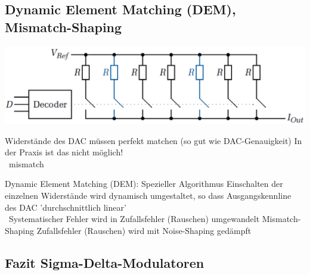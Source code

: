 \subsection{Dynamic Element Matching (DEM), Mismatch-Shaping}

\begin{minipage}[c]{0.4\columnwidth}
    \includegraphics[width=\columnwidth]{images/strom-DAC.png}
\end{minipage}
\hfill
\begin{minipage}[c]{0.58\columnwidth}
    \begin{outline}
        \1 Widerstände des DAC müssen perfekt matchen (so gut wie DAC-Genauigkeit)
            \2 In der Praxis ist das nicht möglich!\\
                \textrightarrow\ mismatch
    \end{outline}
\end{minipage}

\vspace{0.2cm}

\begin{outline}
    \1 Dynamic Element Matching (DEM): Spezieller Algorithmus
        \2 Einschalten der einzelnen Widerstände wird dynamisch umgestaltet, so dass Ausgangskennline des DAC 
            'durchschnittlich linear' \\
            \textrightarrow\ Systematischer Fehler wird in Zufallsfehler (Rauschen) umgewandelt
    \1 Mismatch-Shaping 
        \2 Zufallsfehler (Rauschen) wird mit Noise-Shaping gedämpft
\end{outline}


\subsection{Fazit Sigma-Delta-Modulatoren}

